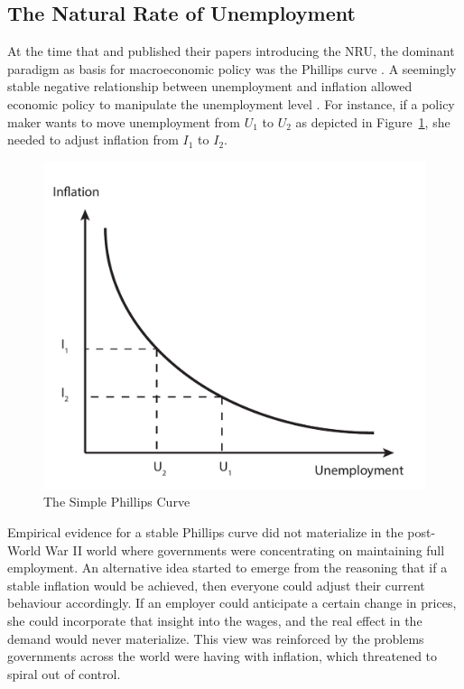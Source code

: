 \documentclass[12pt,a4paper,english]{article}
\begin{document}
\vspace{2cm}

\subsection{The Natural Rate of Unemployment}

At the time that \cite{friedman1968} and \cite{phelps1967} published their papers introducing the NRU, the dominant paradigm as basis for macroeconomic policy was the Phillips curve \citep{nelson2007}. A seemingly stable negative relationship between unemployment and inflation allowed economic policy to manipulate the unemployment level \citep{phillips1958}. For instance, if a policy maker wants to move unemployment from $U_1$ to $U_2$ as depicted in Figure~\ref{fig:phillipscurve1}, she needed to adjust inflation from $I_1$ to $I_2$.


\begin{figure}[h]
\vspace{1.5cm}
	\centering
	\includegraphics[width=0.75\linewidth]{Graphs/Phillips_curve_1}
	\caption{The Simple	 Phillips Curve}
	\label{fig:phillipscurve1}
\vspace{1.5cm}
\end{figure}


Empirical evidence for a stable Phillips curve did not materialize in the post-World War II world where governments were concentrating on maintaining full employment. An alternative idea started to emerge from the reasoning that if a stable inflation would be achieved, then everyone could adjust their current behaviour accordingly. If an employer could anticipate a certain change in prices, she could incorporate that insight into the wages, and the real effect in the demand would never materialize. This view was reinforced by the problems governments across the world were having with inflation, which threatened to spiral out of control.  \citep{friedman1977, nelson2007, blanchard1986}
\end{document}
